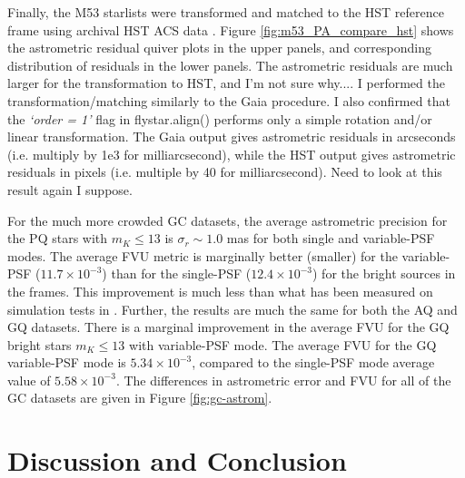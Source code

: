 \documentclass[]{spie}  %
\begin{document}
Finally, the M53 starlists were transformed and matched to the HST reference frame using archival HST ACS data \citep{service:2016a}. Figure \ref{fig:m53_PA_compare_hst} shows the astrometric residual quiver plots in the upper panels, and corresponding distribution of residuals in the lower panels. The astrometric residuals are much larger for the transformation to HST, and I'm not sure why.... I performed the transformation/matching similarly to the Gaia procedure. I also confirmed that the \textit{`order = 1'} flag in flystar.align() performs only a simple rotation and/or linear transformation. The Gaia output gives astrometric residuals in arcseconds (i.e. multiply by 1e3 for milliarcsecond), while the HST output gives astrometric residuals in pixels (i.e. multiple by 40 for milliarcsecond). Need to look at this result again I suppose.

\indent For the much more crowded GC datasets, the average astrometric precision for the PQ stars with $m_{K} \leq 13$ is $\sigma_{{r}}{\sim}1.0$ mas for both single and variable-PSF modes. The average FVU metric is marginally better (smaller) for the variable-PSF ($11.7\times10^{-3}$) than for the single-PSF ($12.4\times10^{-3}$) for the bright sources in the frames. This improvement is much less than what has been measured on simulation tests in \cite{Turri:inprep}. Further, the results are much the same for both the AQ and GQ datasets. There is a marginal improvement in the average FVU for the GQ bright stars $m_{K} \leq 13$ with variable-PSF mode. The average FVU for the GQ variable-PSF mode is $5.34\times10^{-3}$, compared to the single-PSF mode average value of $5.58\times10^{-3}$. The differences in astrometric error and FVU for all of the GC datasets are given in Figure \ref{fig:gc-astrom}.

\section{Discussion and Conclusion} \label{sec:conclusion}
\end{document}
